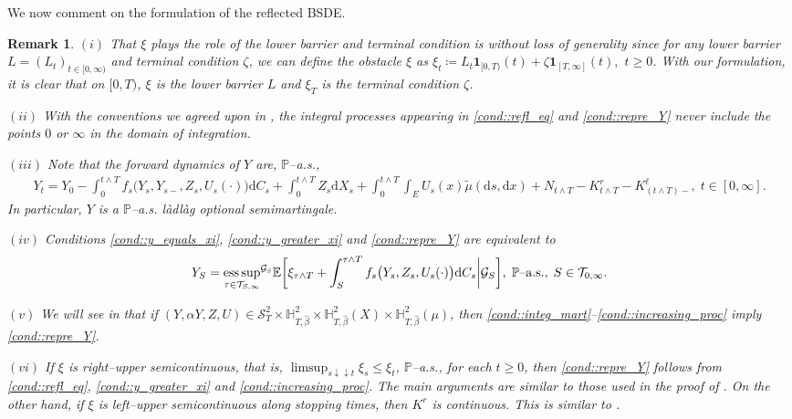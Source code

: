 \documentclass[10pt]{article} %
\newtheorem{remark}[theorem]{Remark}
\newcommand\cG{\mathcal G}
\newcommand\cS{\mathcal S}
\newcommand\cT{\mathcal T}
\newcommand{\smalltext}[1]{\text{\fontsize{4}{4}\selectfont$#1$}}
\def \E{\mathbb{E}}
\def \H{\mathbb{H}}
\def \P{\mathbb{P}}
\def\d{\mathrm{d}}
\DeclareMathOperator*{\esssup}{ess\,sup}
\begin{document}
We now comment on the formulation of the reflected BSDE. 
\begin{remark}\label{rem::after_formulation}
	$(i)$ That $\xi$ plays the role of the lower barrier and terminal condition is without loss of generality since for any lower barrier $L = (L_t)_{t \in [0,\infty)}$ and terminal condition $\zeta$, we can define the obstacle $\xi$ as $\xi_t \coloneqq L_t \mathbf{1}_{[0,T)}(t) + \zeta \mathbf{1}_{[T,\infty]}(t),$ $t\geq 0$. With our formulation, it is clear that on $[0,T)$, $\xi$ is the lower barrier $L$ and $\xi_T$ is the terminal condition $\zeta$.
	
	\medskip
	$(ii)$ With the conventions we agreed upon in {\rm{}}, the integral processes appearing in \ref{cond::refl_eq} and \ref{cond::repre_Y} never include the points $0$ or $\infty$ in the domain of integration.
	
	\medskip
	$(iii)$ Note that the forward dynamics of $Y$ are, $\P${\rm--a.s.},
	\begin{align*}
			Y_t = Y_0 - \int_0^{t \land T} f_s\big(Y_s,Y_{s-},Z_s,U_s(\cdot)\big) \d C_s  + \int_0^{t \land T} Z_s \d X_s + \int_0^{t \wedge T} \int_E U_s(x)\tilde\mu(\d s, \d x) + N_{t \land T} - K^r_{t \land T} - K^{\ell}_{(t \land T)-}, \; t \in [0,\infty].
		\end{align*}
	In particular, $Y$ is a $\P${\rm--a.s.} l\`adl\`ag optional semimartingale.
	
	\medskip
	$(iv)$ Conditions \ref{cond::y_equals_xi}, \ref{cond::y_greater_xi} and \ref{cond::repre_Y} are equivalent to
	\begin{equation*}
		Y_S = {\esssup_{\tau \in \cT_{S,\infty}}}^{\cG_\smalltext{S}} \E \bigg[  \xi_{\tau \land T} + \int_S^{\tau \land T} f_s\big(Y_s, Z_s, U_s(\cdot)\big) \d C_s \bigg| \cG_S \bigg], \; \text{$\P$\rm--a.s.}, \; S \in \cT_{0,\infty}.
	\end{equation*}
	
	$(v)$ We will see in {\rm{}} that if $(Y,\alpha Y,Z,U) \in \cS^2_T \times \H^2_{T,\hat\beta} \times \H^2_{T,\hat\beta}(X) \times \H^2_{T,\hat\beta}(\mu)$, then \ref{cond::integ_mart}--\ref{cond::increasing_proc} imply \ref{cond::repre_Y}.
	
	\medskip
	$(vi)$ If $\xi$ is right--upper semicontinuous, that is, $\limsup_{s \downarrow\downarrow t} \xi_s \leq \xi_t$, $\P${\rm--a.s.}, for each $t\geq 0$, then \ref{cond::repre_Y} follows from \ref{cond::refl_eq}, \ref{cond::y_greater_xi} and \ref{cond::increasing_proc}. The main arguments are similar to those used in the proof of {\rm\cite[Lemma 4.1]{grigorova2017reflected}}. On the other hand, if $\xi$ is left--upper semicontinuous along stopping times, then $K^r$ is continuous. This is similar to {\rm\cite[Remark 2.4]{grigorova2020optimal}}.


\end{remark}
\end{document}
